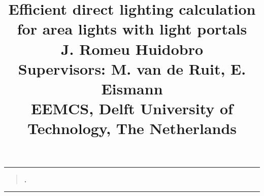 \documentclass[]{article}
\title{%
  \huge \textbf{Efficient direct lighting calculation for area lights with light portals}\\
  \vspace{0.4cm}
  \Large J. Romeu Huidobro\\
  \vspace{0.3cm}
  \large Supervisors:\; M. van de Ruit, E. Eismann\\
  \vspace{0.3cm}
  EEMCS, Delft University of Technology, The Netherlands
  \vspace{-0.8cm}
}
\author{}
\date{}
\renewenvironment{abstract}
{
\noindent \rule{\linewidth}{.5pt}
\begin{quote}
\par{\bfseries \abstractname.}
}
{
\end{quote}
\medskip\noindent \rule{\linewidth}{.5pt}
}
\begin{document}
\newcommand{\from}[0]{\leftarrow}

\maketitle

\begin{abstract}
  \blindtext[1]
\end{abstract}

\begin{multicols*}{2}
  









\printbibliography[heading=bibintoc, title={References}]

\end{multicols*}
\end{document}
